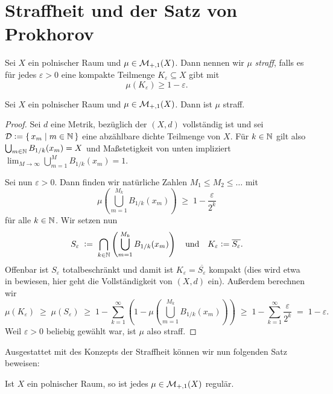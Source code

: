 \documentclass[../main/main.tex]{subfiles}
\begin{document}
	
	\section{Straffheit und der Satz von Prokhorov}
	
	\begin{Definition}
		Sei $X$ ein polnischer Raum und $\mu \in \mathcal{M}_{+,1}(X)$. Dann nennen wir 
		$\mu$ \emph{straff}, falls es für jedes $\varepsilon > 0$ eine kompakte Teilmenge
		$K_\varepsilon \subseteq X$ gibt mit 
		\[ \mu(K_\varepsilon) \geq 1  - \varepsilon \text{.} \]
	\end{Definition}
	
	\begin{Satz}
		\label{thm:tightness}
		Sei $X$ ein polnischer Raum und $\mu \in \mathcal{M}_{+,1}(X)$. Dann ist $\mu$ straff.
	\end{Satz}
	
	\begin{proof}
		Sei $d$ eine Metrik, bezüglich der $(X, d)$ vollständig ist und sei 
		$\mathcal{D} \vcentcolon = \left\{\, x_m \; \middle| \; m \in \mathbb{N} \,\right\}$ eine abzählbare dichte Teilmenge von $X$. 
		Für $k \in \mathbb{N}$ gilt also $\bigcup_{m \in \mathbb{N}} B_{1/k}(x_m) = X$ und Maßstetigkeit 
		von unten impliziert 
		$\lim_{M \to \infty} \bigcup_{m=1}^{M} B_{1/k}(x_m) = 1$.
		
		Sei nun $\varepsilon > 0$. Dann finden wir natürliche Zahlen $M_1 \leq M_2 \leq \dots$ mit
		\[ \mu\left( \bigcup_{m=1}^{M_k} B_{1/k}(x_m) \right) \; \geq \; 1 - \frac{\varepsilon}{2^k} \]
		für alle $k \in \mathbb{N}$. Wir setzen nun
		\[ S_\varepsilon 
		\; \vcentcolon = \; \bigcap_{k \in \mathbb{N}} \left( \bigcup_{m=1}^{M_k} B_{1/k}(x_m) \right) 
		\quad \text{und} \quad K_\varepsilon \vcentcolon = \overline{S_\varepsilon} \text{.} \]
		Offenbar ist $S_\varepsilon$ totalbeschränkt und damit ist $K_\varepsilon = \overline{S_\varepsilon}$ 
		kompakt (dies wird etwa in \cite[Satz 2.3.8]{Simon.2015} bewiesen, 
		hier geht die Vollständigkeit von $(X, d)$ ein).
		Außerdem berechnen wir
		\[ \mu(K_\varepsilon) 
		\; \geq \; \mu(S_\varepsilon) 
		\; \geq \; 1 - \sum_{k=1}^{\infty} \left( 1 - \mu\left( \bigcup_{m=1}^{M_k} B_{1/k}(x_m) \right) \right) 
		\; \geq \; 1 - \sum_{k=1}^{\infty} \frac{\varepsilon}{2^k} \; = \; 1 - \varepsilon \text{.} \]
		Weil $\varepsilon > 0$ beliebig gewählt war, ist $\mu$ also straff.
	\end{proof}
	
	Ausgestattet mit des Konzepts der Straffheit können wir nun folgenden Satz beweisen:
	
	\begin{Folgerung}
		\label{kor:polishregular}
		Ist $X$ ein polnischer Raum, so ist jedes $\mu \in \mathcal{M}_{+,1}(X)$ regulär.
	\end{Folgerung}
	
\end{document}
